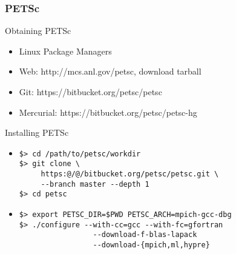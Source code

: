 


\begin{frame}[fragile]
\frametitle{PETSc}
 \begin{block}{Obtaining PETSc}
 \begin{itemize}
  \item Linux Package Managers
  \item Web: http://mcs.anl.gov/petsc, download tarball
  \item Git: https://bitbucket.org/petsc/petsc
  \item Mercurial: https://bitbucket.org/petsc/petsc-hg
 \end{itemize}
 \end{block}

 \begin{block}{Installing PETSc}
 \begin{itemize}
  \item
 \begin{lstlisting}[escapechar={@}]
$> cd /path/to/petsc/workdir
$> git clone \
     https:@/@/bitbucket.org/petsc/petsc.git \
     --branch master --depth 1
$> cd petsc
 \end{lstlisting}
  \item
 \begin{lstlisting}
$> export PETSC_DIR=$PWD PETSC_ARCH=mpich-gcc-dbg
$> ./configure --with-cc=gcc --with-fc=gfortran 
                 --download-f-blas-lapack
                 --download-{mpich,ml,hypre}
\end{lstlisting}
 \end{itemize}
 \end{block}

\end{frame}

